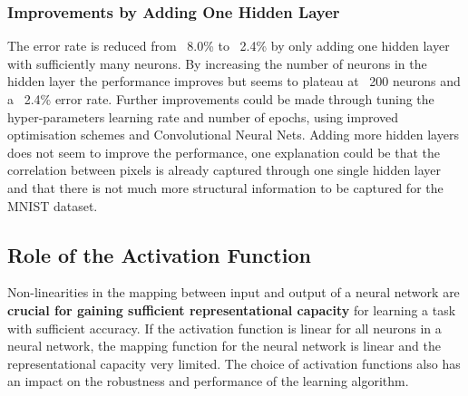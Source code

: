 \documentclass[11pt]{article}
\begin{document}
\subsubsection{Improvements by Adding One Hidden Layer}

The error rate is reduced from ~8.0\% to ~2.4\% by only adding one hidden layer with sufficiently many neurons. By increasing the number of neurons in the hidden layer the performance improves but seems to plateau at ~200 neurons and a ~2.4\% error rate. Further improvements could be made through tuning the hyper-parameters learning rate and number of epochs, using improved optimisation schemes and Convolutional Neural Nets. Adding more hidden layers does not seem to improve the performance, one explanation could be that the correlation between pixels is already captured through one single hidden layer and that there is not much more structural information to be captured for the MNIST dataset.

\subsection{Role of the Activation Function}

Non-linearities in the mapping between input and output of a neural network are \textbf{crucial for gaining sufficient representational capacity} for learning a task with sufficient accuracy. If the activation function is linear for all neurons in a neural network, the mapping function for the neural network is linear and the representational capacity very limited. The choice of activation functions also has an impact on the robustness and performance of the learning algorithm.
\end{document}
